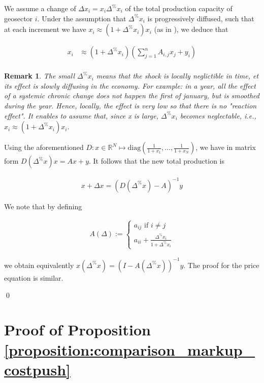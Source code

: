 \documentclass{article}
\newtheorem{remark}{Remark}
\begin{document}
We assume a change of $\Delta x_i=x_i \Delta^\% x_i$ of the total production capacity of geosector $i$. Under the assumption that $\Delta^\% x_i$ is progressively diffused, such that at each increment we have $x_i \approx (1 + \Delta^{\%}x_i) x_i$ (as in \cite{desnos2023climate}), we deduce that

\begin{align*}
    x_i & \approx (1 + \Delta^{\%}x_i) \left( \sum_{j=1}^n A_{i,j} x_j + y_i \right) \\
\end{align*}

\begin{remark}
The small $\Delta^\% x_i$ means that the shock is locally neglictible in time, et its effect is slowly diffusing in the economy. For example: in a year, all the effect of a systemic chronic change does not happen the first of january, but is smoothed during the year. Hence, locally, the effect is very low so that there is no "reaction effect". It enables to assume that, since x is large, $\Delta^{\%}x_i$ becomes neglectable, i.e., $x_i \approx (1 + \Delta^{\%}x_i) x_i$. 
\end{remark}

\noindent Using the aforementioned $D:x \in \mathbb{R}^N \mapsto \text{diag} \left( \frac{1}{1 + x_1}, \dots, \frac{1}{1 + x_N} \right)$, we have in matrix form $D(\Delta^\%x) x = Ax + y$. It follows that the new total production is

\begin{align*}
    x + \Delta x = \left(D(\Delta^\%x) - A \right)^{-1} y
\end{align*}

\noindent We note that by defining 

\begin{align*}
    A\left(\Delta \right) := \begin{cases} a_{ij} \text{ if } i \neq j \\
    a_{ii} + \frac{\Delta^{\%}x_i}{1+\Delta^{\%}x_i}
    \end{cases}
\end{align*}

\noindent we obtain equivalently $x(\Delta^{\%}x) = \left(I - A(\Delta^{\%}x) \right)^{-1} y$. The proof for the price equation is similar. 

\qed

\section{Proof of Proposition \ref{proposition:comparison_markup_costpush}}
\label{appendix:comparison_markup_costpush}
\end{document}
